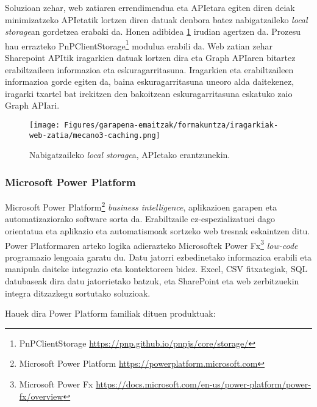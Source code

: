 Soluzioan zehar, web zatiaren errendimendua eta APIetara egiten diren deiak minimizatzeko APIetatik lortzen diren datuak denbora batez
nabigatzaileko \textit{local storage}an gordetzea erabaki da. Honen adibidea \ref{ads-caching} irudian agertzen da. Prozesu hau errazteko 
PnPClientStorage\footnote{PnPClientStorage \url{https://pnp.github.io/pnpjs/core/storage/}} modulua erabili da.
Web zatian zehar Sharepoint APItik iragarkien datuak lortzen dira eta Graph APIaren bitartez erabiltzaileen informazioa eta eskuragarritasuna.
Iragarkien eta erabiltzaileen informazioa gorde egiten da, baina eskuragarritasuna uneoro alda daitekenez, iragarki txartel bat irekitzen den
bakoitzean eskuragarritasuna eskatuko zaio Graph APIari.

\begin{figure}[H]
\centering
\texttt{[image: Figures/garapena-emaitzak/formakuntza/iragarkiak-web-zatia/mecano3-caching.png]}
\caption{Nabigatzaileko \textit{local storage}a, APIetako erantzunekin.}
\label{ads-caching}
\end{figure}


\subsubsection{Microsoft Power Platform}
Microsoft Power Platform\footnote{Microsoft Power Platform \url{https://powerplatform.microsoft.com}} \textit{business intelligence}, aplikazioen garapen eta automatizaziorako software sorta da. Erabiltzaile
ez-espezializatuei dago orientatua eta aplikazio eta automatismoak sortzeko web tresnak eskaintzen ditu. Power Platformaren
arteko logika adierazteko Microsoftek Power Fx\footnote{Microsoft Power Fx \url{https://docs.microsoft.com/en-us/power-platform/power-fx/overview}} \textit{low-code} programazio lengoaia garatu du. Datu jatorri ezbedinetako informazioa erabili
eta manipula daiteke integrazio eta kontektoreen bidez. Excel, CSV fitxategiak, SQL datubaseak dira datu jatorrietako batzuk, eta
SharePoint eta web zerbitzuekin integra ditzazkegu sortutako soluzioak.

Hauek dira Power Platform familiak dituen produktuak:

